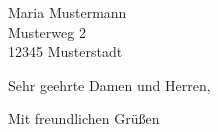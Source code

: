 \documentclass[DIN,parskip=half,fontsize=11pt,fromalign=right,fromrule=afteraddress,ngerman,enlargefirstpage=true]{scrlttr2}
\date{\usekomavar{fromplace}, \getfourfromjobname.\getthreefromjobname.\gettwofromjobname}
\begin{document}
\begin{letter}{Maria Mustermann \\ Musterweg 2 \\ 12345 Musterstadt}
\opening{Sehr geehrte Damen und Herren,} 
 
\blindtext[5]
 
\closing{Mit freundlichen Grüßen}
 
\end{letter}
\end{document}
